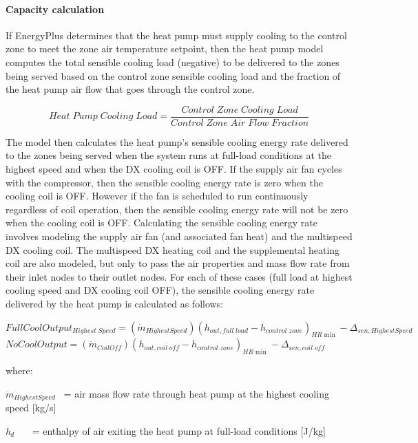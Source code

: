 \paragraph{Capacity calculation}\label{capacity-calculation}

If EnergyPlus determines that the heat pump must supply cooling to the control zone to meet the zone air temperature setpoint, then the heat pump model computes the total sensible cooling load (negative) to be delivered to the zones being served based on the control zone sensible cooling load and the fraction of the heat pump air flow that goes through the control zone.

\begin{equation}
Heat\;Pump\;Cooling\;Load = \frac{{Control\;Zone\;Cooling\;Load}}{{Control\;Zone\;Air\;Flow\;Fraction}}
\end{equation}

The model then calculates the heat pump's sensible cooling energy rate delivered to the zones being served when the system runs at full-load conditions at the highest speed and when the DX cooling coil is OFF. If the supply air fan cycles with the compressor, then the sensible cooling energy rate is zero when the cooling coil is OFF. However if the fan is scheduled to run continuously regardless of coil operation, then the sensible cooling energy rate will not be zero when the cooling coil is OFF. Calculating the sensible cooling energy rate involves modeling the supply air fan (and associated fan heat) and the multispeed DX cooling coil. The multispeed DX heating coil and the supplemental heating coil are also modeled, but only to pass the air properties and mass flow rate from their inlet nodes to their outlet nodes. For each of these cases (full load at highest cooling speed and DX cooling coil OFF), the sensible cooling energy rate delivered by the heat pump is calculated as follows:

\(FullCoolOutpu{t_{Highest\;Speed}} = \left( {{{\dot m}_{HighestSpeed}}} \right){\left( {{h_{out,full\;load}} - {h_{control\;zone}}} \right)_{HR\min }} - {\Delta_{sen,HighestSpeed}}\) \(NoCoolOutput = \left( {{{\dot m}_{CoilOff}}} \right){\left( {{h_{out,coil\;off}} - {h_{control\;zone}}} \right)_{HR\min }} - {\Delta_{sen,coil\;off}}\)

where:

\emph{\({\dot m}_{HighestSpeed}\)}~ = air mass flow rate through heat pump at the highest cooling speed {[}kg/s{]}

\emph{h\(_{d}\)}~~~ = enthalpy of air exiting the heat pump at full-load conditions {[}J/kg{]}

